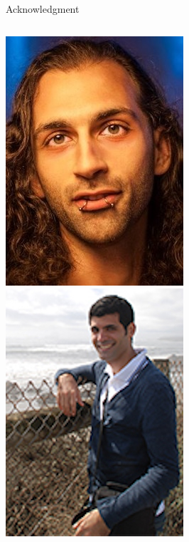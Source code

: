 \begin{frame}{Acknowledgment}
\begin{columns}
    \includegraphics[width=0.9\linewidth]{figures/shaver.jpg}
    \includegraphics[width=0.9\linewidth]{figures/iannopollo.jpg}


\end{columns}
\end{frame}
